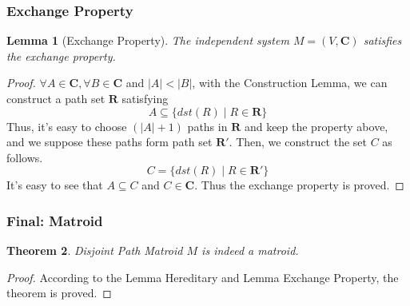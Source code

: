 \documentclass[notheorems]{beamer}
\newtheorem{theorem}{Theorem}
\newtheorem{lemma}[theorem]{Lemma}
\begin{document}
\begin{frame}
\frametitle{Exchange Property}
\begin{lemma}[Exchange Property]
The independent system $M = (V, \mathbf{C})$ satisfies the exchange property.
\end{lemma}
\begin{proof}
$\forall A\in \mathbf{C}, \forall B\in \mathbf{C}$ and $|A| < |B|$, with the Construction Lemma, we can construct a path set $\mathbf{R}$ satisfying
\begin{displaymath}
A \subseteq \{dst(R) \mid R \in \mathbf{R}\}
\end{displaymath}
Thus, it's easy to choose $(|A| + 1)$ paths in $\mathbf{R}$ and keep the property above, and we suppose these paths form path set $\mathbf{R}'$. Then, we construct the set $C$ as follows.
\begin{displaymath}
C = \{dst(R) \mid R \in \mathbf{R}'\}
\end{displaymath}
It's easy to see that $A \subseteq C$ and $C \in \mathbf{C}$. Thus the exchange property is proved.
\end{proof}
\end{frame}

\begin{frame}
\frametitle{Final: Matroid}
\begin{theorem}
Disjoint Path Matroid $M$ is indeed a matroid.
\end{theorem}
\begin{proof}
According to the Lemma Hereditary and Lemma Exchange Property, the theorem is proved.
\end{proof}
\end{frame}
\end{document}
